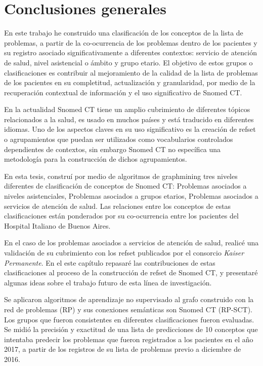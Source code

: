 \section{Conclusiones generales}
En este trabajo he construido una clasificación de los conceptos de la lista de problemas, a partir de la co-ocurrencia de los problemas dentro de los pacientes y su registro asociado significativamente a diferentes contextos: servicio de atención de salud, nivel asistencial o ámbito y grupo etario. El objetivo de estos grupos o clasificaciones es contribuir al mejoramiento de la calidad de la lista de problemas de los pacientes en su completitud, actualización y granularidad, por medio de la recuperación contextual de información y el uso significativo de Snomed CT.

En la actualidad Snomed CT tiene un amplio cubrimiento de diferentes tópicos relacionados a la salud, es usado en muchos países y está traducido en diferentes idiomas. Uno de los aspectos claves en su uso significativo es la creación de \acrshort{refset} o agrupamientos que puedan ser utilizados como vocabularios controlados dependientes de contextos, sin embargo Snomed CT no específica una metodología para la construcción de dichos agrupamientos.

En esta tesis, construí por medio de algoritmos de graphmining tres niveles diferentes de clasificación de conceptos de Snomed CT: Problemas asociados a niveles asistenciales, Problemas asociados a grupos etarios, Problemas asociados a servicios de atención de salud. Las relaciones entre los conceptos de estas clasificaciones están ponderados por su co-ocurrencia entre los pacientes del Hospital Italiano de Buenos Aires.

En el caso de los problemas asociados a servicios de atención de salud, realicé una validación de su cubrimiento con los \acrshort{refset} publicados por el consorcio \textit{Kaiser Permanente}. En el este capítulo repasaré las contribuciones de estas clasificaciones al proceso de la construcción de \acrshort{refset} de Snomed CT, y presentaré algunas ideas sobre el trabajo futuro de esta línea de investigación.

Se aplicaron algoritmos de aprendizaje no supervisado al grafo construido con la red de problemas (\acrshort{RP})  y sus conexiones semánticas son Snomed CT (\acrshort{RP-SCT}). Los grupos que fueron consistentes en diferentes clasificaciones fueron evaluadas. Se midió  la precisión y exactitud de una lista de predicciones de 10 conceptos que intentaba predecir los problemas que fueron registrados a los pacientes en el año 2017, a partir de los registros de su lista de problemas previo a diciembre de 2016. 

